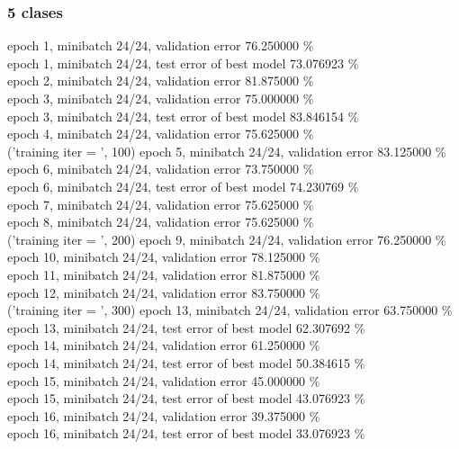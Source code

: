 \documentclass[a4paper]{article}
\begin{document}
\subsubsection{5 clases}
epoch 1, minibatch 24/24, validation error 76.250000 \% \\
     epoch 1, minibatch 24/24, test error of best model 73.076923 \% \\
epoch 2, minibatch 24/24, validation error 81.875000 \% \\
epoch 3, minibatch 24/24, validation error 75.000000 \% \\
     epoch 3, minibatch 24/24, test error of best model 83.846154 \% \\
epoch 4, minibatch 24/24, validation error 75.625000 \% \\
('training \@ iter = ', 100)
epoch 5, minibatch 24/24, validation error 83.125000 \% \\
epoch 6, minibatch 24/24, validation error 73.750000 \% \\
     epoch 6, minibatch 24/24, test error of best model 74.230769 \% \\
epoch 7, minibatch 24/24, validation error 75.625000 \% \\
epoch 8, minibatch 24/24, validation error 75.625000 \% \\
('training \@ iter = ', 200)
epoch 9, minibatch 24/24, validation error 76.250000 \% \\
epoch 10, minibatch 24/24, validation error 78.125000 \% \\
epoch 11, minibatch 24/24, validation error 81.875000 \% \\
epoch 12, minibatch 24/24, validation error 83.750000 \% \\
('training \@ iter = ', 300)
epoch 13, minibatch 24/24, validation error 63.750000 \% \\
     epoch 13, minibatch 24/24, test error of best model 62.307692 \% \\
epoch 14, minibatch 24/24, validation error 61.250000 \% \\
     epoch 14, minibatch 24/24, test error of best model 50.384615 \% \\
epoch 15, minibatch 24/24, validation error 45.000000 \% \\
     epoch 15, minibatch 24/24, test error of best model 43.076923 \% \\
epoch 16, minibatch 24/24, validation error 39.375000 \% \\
     epoch 16, minibatch 24/24, test error of best model 33.076923 \% \\
\end{document}
